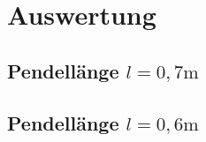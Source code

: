 \section{Auswertung}

\subsection{Pendellänge $l = 0,7 \si{\meter} $}
\begin{minipage}{\textwidth}

 \hfill

\end{minipage}


\begin{minipage}{\textwidth}

 \hfill

\end{minipage}

\begin{minipage}{\textwidth}

 \hfill

\end{minipage}


\subsection{Pendellänge $l = 0,6 \si{\meter} $}
\begin{minipage}{\textwidth}

 \hfill

\end{minipage}


\begin{minipage}{\textwidth}

 \hfill

\end{minipage}

\begin{minipage}{\textwidth}

 \hfill

\end{minipage}

\begin{minipage}{\textwidth}

 \hfill

\end{minipage}
